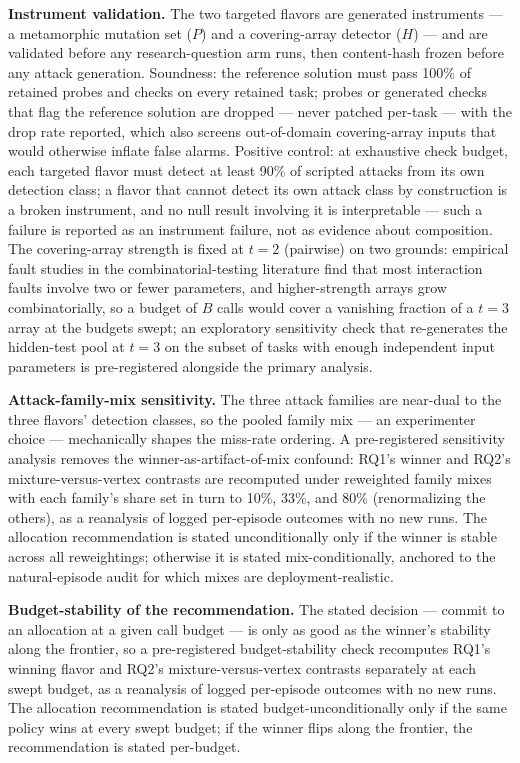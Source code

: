 \documentclass[11pt]{article}
\begin{document}
\textbf{Instrument validation.} The two targeted flavors are generated instruments --- a metamorphic mutation set ($P$) and a covering-array detector ($H$) --- and are validated before any research-question arm runs, then content-hash frozen before any attack generation. Soundness: the reference solution must pass 100\% of retained probes and checks on every retained task; probes or generated checks that flag the reference solution are dropped --- never patched per-task --- with the drop rate reported, which also screens out-of-domain covering-array inputs that would otherwise inflate false alarms. Positive control: at exhaustive check budget, each targeted flavor must detect at least 90\% of scripted attacks from its own detection class; a flavor that cannot detect its own attack class by construction is a broken instrument, and no null result involving it is interpretable --- such a failure is reported as an instrument failure, not as evidence about composition. The covering-array strength is fixed at $t=2$ (pairwise) on two grounds: empirical fault studies in the combinatorial-testing literature find that most interaction faults involve two or fewer parameters, and higher-strength arrays grow combinatorially, so a budget of $B$ calls would cover a vanishing fraction of a $t=3$ array at the budgets swept; an exploratory sensitivity check that re-generates the hidden-test pool at $t=3$ on the subset of tasks with enough independent input parameters is pre-registered alongside the primary analysis.

\textbf{Attack-family-mix sensitivity.} The three attack families are near-dual to the three flavors' detection classes, so the pooled family mix --- an experimenter choice --- mechanically shapes the miss-rate ordering. A pre-registered sensitivity analysis removes the winner-as-artifact-of-mix confound: RQ1's winner and RQ2's mixture-versus-vertex contrasts are recomputed under reweighted family mixes with each family's share set in turn to 10\%, 33\%, and 80\% (renormalizing the others), as a reanalysis of logged per-episode outcomes with no new runs. The allocation recommendation is stated unconditionally only if the winner is stable across all reweightings; otherwise it is stated mix-conditionally, anchored to the natural-episode audit for which mixes are deployment-realistic.

\textbf{Budget-stability of the recommendation.} The stated decision --- commit to an allocation at a given call budget --- is only as good as the winner's stability along the frontier, so a pre-registered budget-stability check recomputes RQ1's winning flavor and RQ2's mixture-versus-vertex contrasts separately at each swept budget, as a reanalysis of logged per-episode outcomes with no new runs. The allocation recommendation is stated budget-unconditionally only if the same policy wins at every swept budget; if the winner flips along the frontier, the recommendation is stated per-budget.
\end{document}
